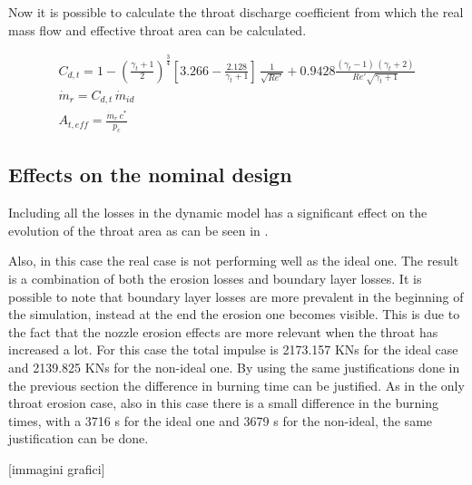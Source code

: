 \begin{itemize}
    Now it is possible to calculate the throat discharge coefficient from which the real mass flow and effective throat area can be calculated.  

    \begin{gather}
        C_{d,t} = 1 - \left( \frac{\gamma_t+1}{2} \right)^{\frac{3}{4}}
        \left[3.266 - \frac{2.128}{\gamma_t+1} \right] \, \frac{1}{\sqrt{Re'}} + 0.9428 \frac{(\gamma_t - 1) \, (\gamma_t + 2)}{Re' \sqrt{\gamma_t + 1}} \\
        \dot{m}_r = C_{d,t} \, \dot{m}_{id} \\
        A_{t,eff} = \frac{\dot{m}_r \, c^*}{p_c}
    \end{gather}
\end{itemize}

\subsection{Effects on the nominal design}  

Including all the losses in the dynamic model has a significant effect on the evolution of the throat area as can be seen in \mref.


Also, in this case the real case is not performing well as the ideal one. The result is a combination of both the erosion losses and boundary layer losses. It is possible to note that boundary layer losses are more prevalent in the beginning of the simulation, instead at the end the erosion one becomes visible. This is due to the fact that the nozzle erosion effects are more relevant when the throat has increased a lot. For this case the total impulse is 2173.157 KNs for the ideal case and 2139.825 KNs for the non-ideal one. By using the same justifications done in the previous section the difference in burning time can be justified. As in the only throat erosion case, also in this case there is a small difference in the burning times, with a 3716 s for the ideal one and 3679 s for the non-ideal, the same justification can be done. 

[immagini grafici]       
